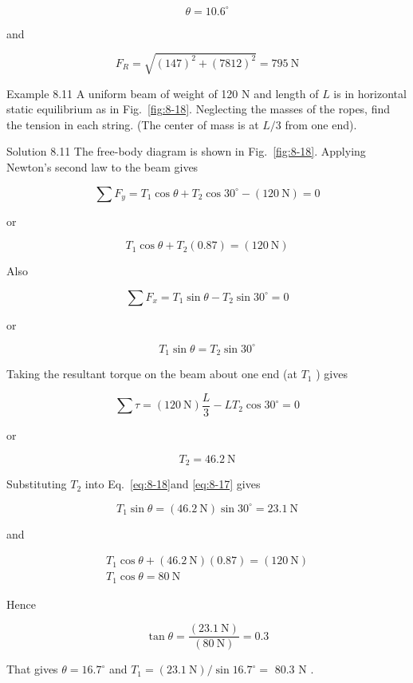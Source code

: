 \documentclass[10pt]{article}
\numberwithin{equation}{section}
\begin{document}
$$
\theta=10.6^{\circ}
$$

and

$$
F_{R}=\sqrt{(147)^{2}+(7812)^{2}}=795 \mathrm{~N}
$$

Example 8.11 A uniform beam of weight of 120 N and length of $L$ is in horizontal static equilibrium as in Fig.~\ref{fig:8-18}. Neglecting the masses of the ropes, find the tension in each string. (The center of mass is at $L / 3$ from one end).

Solution 8.11 The free-body diagram is shown in Fig.~\ref{fig:8-18}. Applying Newton's second law to the beam gives

$$
\sum F_{y}=T_{1} \cos \theta+T_{2} \cos 30^{\circ}-(120 \mathrm{~N})=0
$$

or


\begin{equation}
T_{1} \cos \theta+T_{2}(0.87)=(120 \mathrm{~N}) \label{eq:8-17}
\end{equation}


Also

$$
\sum F_{x}=T_{1} \sin \theta-T_{2} \sin 30^{\circ}=0
$$

or


\begin{equation}
T_{1} \sin \theta=T_{2} \sin 30^{\circ} \label{eq:8-18}
\end{equation}


Taking the resultant torque on the beam about one end (at $T_{1}$ ) gives

$$
\sum \tau=(120 \mathrm{~N}) \frac{L}{3}-L T_{2} \cos 30^{\circ}=0
$$

or

$$
T_{2}=46.2 \mathrm{~N}
$$

Substituting $T_{2}$ into Eq.~\eqref{eq:8-18}and \eqref{eq:8-17} gives

$$
T_{1} \sin \theta=(46.2 \mathrm{~N}) \sin 30^{\circ}=23.1 \mathrm{~N}
$$

and

$$
\begin{gathered}
T_{1} \cos \theta+(46.2 \mathrm{~N})(0.87)=(120 \mathrm{~N}) \\
T_{1} \cos \theta=80 \mathrm{~N}
\end{gathered}
$$

Hence

$$
\tan \theta=\frac{(23.1 \mathrm{~N})}{(80 \mathrm{~N})}=0.3
$$

That gives $\theta=16.7^{\circ}$ and $T_{1}=(23.1 \mathrm{~N}) / \sin 16.7^{\circ}=$ 80.3 N .
\end{document}
